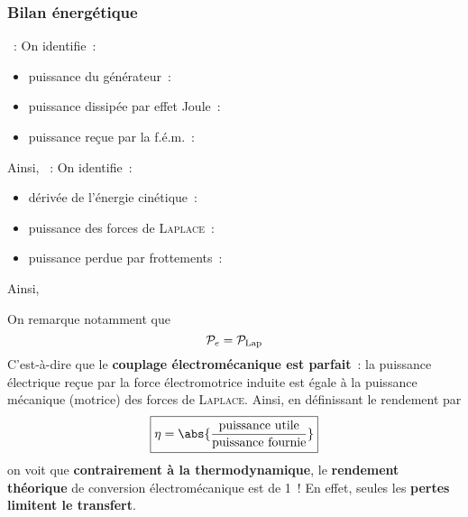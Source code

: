 \documentclass[../main/main.tex]{subfiles}
\begin{document}
\subsubsection{Bilan énergétique}
\label{sssec:rlplmot_bilanrj}
\begin{itemize}[label=$\diamond$, leftmargin=10pt]
	~:  On identifie~:
	\begin{itemize}[label=$\triangleright$, leftmargin=20pt]
		\item puissance du générateur~: 
		\item puissance dissipée par effet Joule~: 
		\item puissance reçue par la f.é.m.~: 
	\end{itemize}
	Ainsi,
	~:  On identifie~:
	\begin{itemize}[label=$\triangleright$, leftmargin=20pt]
		\item dérivée de l'énergie cinétique~: 
		\item puissance des forces de \textsc{Laplace}~: 
		\item puissance perdue par frottements~: 
	\end{itemize}
	Ainsi,
\end{itemize}
On remarque notamment que
\[
	\mathcal{P}_e = \mathcal{P}_{\rm Lap}
\]
C'est-à-dire que le \textbf{couplage électromécanique est parfait}~: la
puissance électrique reçue par la force électromotrice induite est égale à la
puissance mécanique (motrice) des forces de \textsc{Laplace}. Ainsi, en
définissant le rendement par
\[
	\boxed{\eta = \abs{\frac{\text{puissance utile}}{\text{puissance fournie}}}}
\]
on voit que \textbf{contrairement à la thermodynamique}, le \textbf{rendement
	théorique} de conversion électromécanique est de 1~! En effet, seules les
\textbf{pertes limitent le transfert}.
\end{document}
